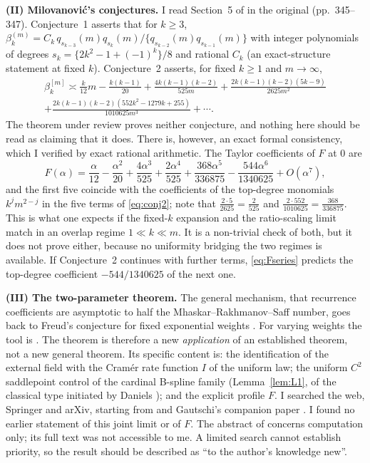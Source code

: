 \documentclass[11pt,a4paper]{article}
\theoremstyle{remark}
\numberwithin{equation}{section}
\begin{document}
\textbf{(II) Milovanovi\'c's conjectures.} I read Section~5 of \cite{milovanovic2017} in the
original (pp.~345--347). Conjecture~1 asserts that for $k\ge3$,
$\beta_k^{(m)}=C_k\,q_{s_{k-3}}(m)q_{s_k}(m)/\{q_{s_{k-2}}(m)q_{s_{k-1}}(m)\}$ with integer
polynomials of degrees $s_k=\{2k^2-1+(-1)^k\}/8$ and rational $C_k$ (an exact-structure
statement at fixed $k$). Conjecture~2 asserts, for fixed $k\ge1$ and $m\to\infty$,
\begin{multline}\label{eq:conj2}
 \beta_k^{[m]}\asymp\frac{k}{12}m-\frac{k(k-1)}{20}+\frac{4k(k-1)(k-2)}{525m}
 +\frac{2k(k-1)(k-2)(5k-9)}{2625m^2}\\
 +\frac{2k(k-1)(k-2)(552k^2-1279k+255)}{1010625m^3}+\cdots .
\end{multline}
The theorem under review proves neither conjecture, and nothing here should be read as
claiming that it does. There is, however, an exact formal consistency, which I verified by
exact rational arithmetic. The Taylor coefficients of $F$ at $0$ are
\begin{equation}\label{eq:Fseries}
 F(\alpha)=\frac{\alpha}{12}-\frac{\alpha^2}{20}+\frac{4\alpha^3}{525}+\frac{2\alpha^4}{525}
 +\frac{368\alpha^5}{336875}-\frac{544\alpha^6}{1340625}+O(\alpha^7),
\end{equation}
and the first five coincide with the coefficients of the top-degree monomials
$k^jm^{2-j}$ in the five terms of \eqref{eq:conj2}; note that
$\frac{2\cdot5}{2625}=\frac{2}{525}$ and $\frac{2\cdot552}{1010625}=\frac{368}{336875}$. This
is what one expects if the fixed-$k$ expansion and the ratio-scaling limit match in an
overlap regime $1\ll k\ll m$. It is a non-trivial check of both, but it does not prove
either, because no uniformity bridging the two regimes is available. If Conjecture~2
continues with further terms, \eqref{eq:Fseries} predicts the top-degree coefficient
$-544/1340625$ of the next one.

\textbf{(III) The two-parameter theorem.} The general mechanism, that recurrence
coefficients are asymptotic to half the Mhaskar--Rakhmanov--Saff number, goes back to
Freud's conjecture for fixed exponential weights \cite{lms1988}. For varying weights the
tool is \cite{levinlubinsky2018}. The theorem is therefore a new \emph{application} of an
established theorem, not a new general theorem. Its specific content is: the identification
of the external field with the Cram\'er rate function $I$ of the uniform law; the uniform
$C^2$ saddlepoint control of the cardinal B-spline family (Lemma~\ref{lem:L1}, of the
classical type initiated by Daniels \cite{daniels1954}); and the explicit profile $F$. I
searched the web, Springer and arXiv, starting from \cite{milovanovic2017} and Gautschi's
companion paper \cite{gautschi2017}. I found no earlier statement of this joint limit or of
$F$. The abstract of \cite{gautschi2017} concerns computation only; its full text was not
accessible to me. A limited search cannot establish priority, so the result should be
described as ``to the author's knowledge new''.
\end{document}
